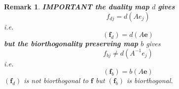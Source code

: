 \documentclass[aps,preprint]{revtex4}
\newtheorem{remark}[theorem]{Remark}
\begin{document}
\begin{remark}
\textbf{IMPORTANT the duality map }$d$ \textbf{gives }%
\begin{equation}
f_{dj}=d\left( Ae_{j}\right)
\end{equation}%
i.e. 
\begin{equation}
\left( \boldsymbol{f}_{d}\right) =d\left( A\boldsymbol{e}\right)
\end{equation}%
\textbf{but the biorthogonality preserving map} $b$ gives 
\begin{equation}
f_{bj}\neq d\left( A^{-1}e_{j}\right)
\end{equation}%
i.e. 
\begin{equation}
\left( \boldsymbol{f}_{b}\right) =b\left( A\boldsymbol{e}\right)
\end{equation}%
$\left( \boldsymbol{f}_{d}\right) $ is \emph{not }biorthogonal to $%
\boldsymbol{f}$ but $\left( \boldsymbol{f}_{b}\right) $ is biorthogonal.
\end{remark}
\end{document}

